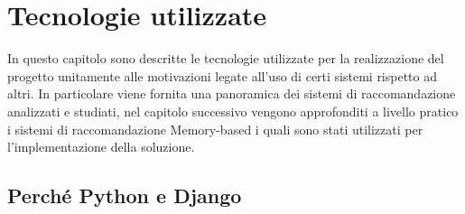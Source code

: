 \chapter{Tecnologie utilizzate}\label{chp:02-technologies}
In questo capitolo sono descritte le tecnologie utilizzate per la realizzazione del progetto unitamente alle motivazioni legate all'uso 
di certi sistemi rispetto ad altri. In particolare viene fornita una panoramica dei sistemi di raccomandazione analizzati e studiati,
nel capitolo successivo vengono approfonditi a livello pratico i sistemi di raccomandazione Memory-based i quali sono stati utilizzati 
per l'implementazione della soluzione.
%
\section{Perché Python e Django}
